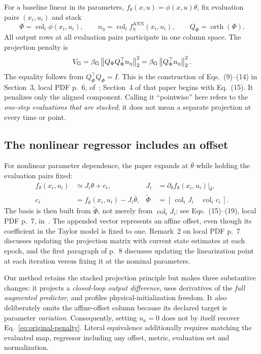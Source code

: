 \documentclass[11pt,a4paper]{article}
\newcommand{\orth}{\operatorname{orth}}
\newcommand{\col}{\operatorname{col}}
\newcommand{\norm}[1]{\left\lVert#1\right\rVert}
\theoremstyle{remark}
\begin{document}
For a baseline linear in its parameters, $f_\theta(x,u)=\phi(x,u)\theta$, fix evaluation pairs $(x_i,u_i)$ and stack
\begin{equation}\label{eq:original-stack}
 \Phi=\col_i\phi(x_i,u_i),\qquad
 n_\eta=\col_i f^{\mathrm{ANN}}_\eta(x_i,u_i),\qquad
 Q_\Phi=\orth(\Phi).
\end{equation}
All output rows at all evaluation pairs participate in one column space. The projection penalty is
\begin{equation}\label{eq:original-penalty}
 V_{\rm G}=\beta_{\rm G}\norm{Q_\Phi Q_\Phi^\top n_\eta}_2^2
           =\beta_{\rm G}\norm{Q_\Phi^\top n_\eta}_2^2.
\end{equation}
The equality follows from $Q_\Phi^\top Q_\Phi=I$. This is the construction of Eqs.~(9)--(14) in Section~3, local PDF p.~6, of~\cite{gyorok2025}; Section~4 of that paper begins with Eq.~(15). It penalizes only the aligned component. Calling it ``pointwise'' here refers to the \emph{one-step evaluations that are stacked}; it does not mean a separate projection at every time or point.

\subsection{The nonlinear regressor includes an offset}
For nonlinear parameter dependence, the paper expands at $\bar\theta$ while holding the evaluation pairs fixed:
\begin{align}
 f_\theta(x_i,u_i)&\simeq J_i\theta+c_i,
 &J_i&=\left.\partial_\theta f_\theta(x_i,u_i)\right|_{\bar\theta},\label{eq:taylorG}\\
 c_i&=f_{\bar\theta}(x_i,u_i)-J_i\bar\theta,
 &\widetilde\Phi&=[\,\col_iJ_i\quad\col_ic_i\,].\label{eq:offsetG}
\end{align}
The basis is then built from $\widetilde\Phi$, not merely from $\col_iJ_i$: see Eqs.~(15)--(19), local PDF p.~7, in~\cite{gyorok2025}. The appended vector represents an affine offset, even though its coefficient in the Taylor model is fixed to one. Remark~2 on local PDF p.~7 discusses updating the projection matrix with current state estimates at each epoch, and the first paragraph of p.~8 discusses updating the linearization point at each iteration versus fixing it at the nominal parameters.

Our method retains the stacked projection principle but makes three substantive changes: it projects a \emph{closed-loop output difference}, uses derivatives of the \emph{full augmented predictor}, and profiles physical-initialization freedom. It also deliberately omits the affine-offset column because its declared target is parameter \emph{variation}. Consequently, setting $n_a=0$ does not by itself recover Eq.~\eqref{eq:original-penalty}. Literal equivalence additionally requires matching the evaluated map, regressor including any offset, metric, evaluation set and normalization.
\end{document}
